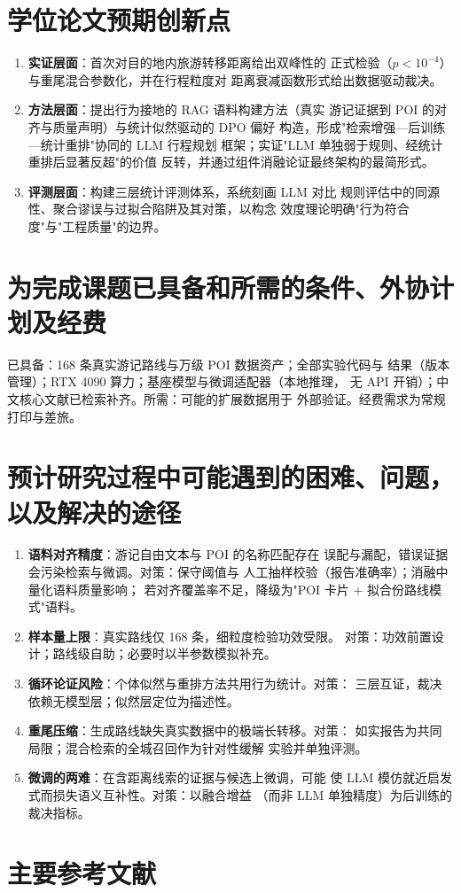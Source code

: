 \section{学位论文预期创新点}

\begin{enumerate}
  \item \textbf{实证层面}：首次对目的地内旅游转移距离给出双峰性的
        正式检验（$p<10^{-4}$）与重尾混合参数化，并在行程粒度对
        距离衰减函数形式给出数据驱动裁决。
  \item \textbf{方法层面}：提出行为接地的 RAG 语料构建方法（真实
        游记证据到 POI 的对齐与质量声明）与统计似然驱动的 DPO 偏好
        构造，形成"检索增强—后训练—统计重排"协同的 LLM 行程规划
        框架；实证"LLM 单独弱于规则、经统计重排后显著反超"的价值
        反转，并通过组件消融论证最终架构的最简形式。
  \item \textbf{评测层面}：构建三层统计评测体系，系统刻画 LLM 对比
        规则评估中的同源性、聚合谬误与过拟合陷阱及其对策，以构念
        效度理论明确"行为符合度"与"工程质量"的边界。
\end{enumerate}

\section{为完成课题已具备和所需的条件、外协计划及经费}

已具备：168 条真实游记路线与万级 POI 数据资产；全部实验代码与
结果（版本管理）；RTX 4090 算力；基座模型与微调适配器（本地推理，
无 API 开销）；中文核心文献已检索补齐。所需：可能的扩展数据用于
外部验证。经费需求为常规打印与差旅。

\section{预计研究过程中可能遇到的困难、问题，以及解决的途径}

\begin{enumerate}
  \item \textbf{语料对齐精度}：游记自由文本与 POI 的名称匹配存在
        误配与漏配，错误证据会污染检索与微调。对策：保守阈值与
        人工抽样校验（报告准确率）；消融中量化语料质量影响；
        若对齐覆盖率不足，降级为"POI 卡片 + 拟合份路线模式"语料。
  \item \textbf{样本量上限}：真实路线仅 168 条，细粒度检验功效受限。
        对策：功效前置设计；路线级自助；必要时以半参数模拟补充。
  \item \textbf{循环论证风险}：个体似然与重排方法共用行为统计。对策：
        三层互证，裁决依赖无模型层；似然层定位为描述性。
  \item \textbf{重尾压缩}：生成路线缺失真实数据中的极端长转移。对策：
        如实报告为共同局限；混合检索的全城召回作为针对性缓解
        实验并单独评测。
  \item \textbf{微调的两难}：在含距离线索的证据与候选上微调，可能
        使 LLM 模仿就近启发式而损失语义互补性。对策：以融合增益
        （而非 LLM 单独精度）为后训练的裁决指标。
\end{enumerate}

\section{主要参考文献}



